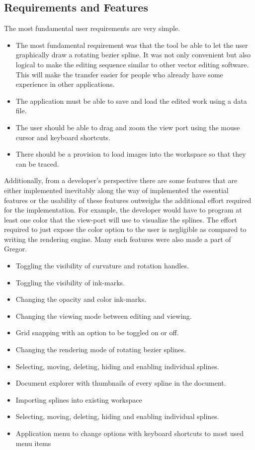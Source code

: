 \subsection{Requirements and Features}
{
    The most fundamental user requirements are very simple.
    \begin{itemize}
      \item
      {
        The most fundamental requirement was that the tool be able to let the user graphically draw a rotating bezier spline. It was not only convenient but also logical to make the editing sequence similar to other vector editing software. This will make the transfer easier for people who already have some experience in other applications.
      }
      \item
      {
        The application must be able to save and load the edited work using a data file.
      }
      \item
      {
        The user should be able to drag and zoom the view port using the mouse cursor and keyboard shortcuts.
      }
      \item
      {
        There should be a provision to load images into the workspace so that they can be traced.
      }
    \end{itemize}

    Additionally, from a developer's perspective there are some features that are either implemented inevitably along the way of implemented the essential features or the usability of these features outweighs the additional effort required for the implementation. For example, the developer would have to program at least one color that the view-port will use to visualize the splines. The effort required to just expose the color option to the user is negligible as compared to writing the rendering engine. Many such features were also made a part of Gregor.

    \begin{itemize}
    \item Toggling the visibility of curvature and rotation handles.
    \item Toggling the visibility of ink-marks.
    \item Changing the opacity and color ink-marks.
    \item Changing the viewing mode between editing and viewing.
    \item Grid snapping with an option to be toggled on or off.
    \item Changing the rendering mode of rotating bezier splines.
    \item Selecting, moving, deleting, hiding and enabling individual splines.
    \item Document explorer with thumbnails of every spline in the document.
    \item Importing splines into existing workspace
    \item Selecting, moving, deleting, hiding and enabling individual splines.
    \item Application menu to change options with keyboard shortcuts to most used menu items
    \end{itemize}
}
